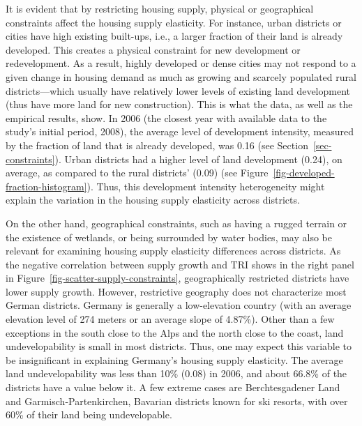 \documentclass[
  12pt,
]{article}
\begin{document}
It is evident that by restricting housing supply, physical or
geographical constraints affect the housing supply elasticity. For
instance, urban districts or cities have high existing built-ups, i.e.,
a larger fraction of their land is already developed. This creates a
physical constraint for new development or redevelopment. As a result,
highly developed or dense cities may not respond to a given change in
housing demand as much as growing and scarcely populated rural
districts---which usually have relatively lower levels of existing land
development (thus have more land for new construction). This is what the
data, as well as the empirical results, show. In 2006 (the closest year
with available data to the study's initial period, 2008), the average
level of development intensity, measured by the fraction of land that is
already developed, was 0.16 (see Section~\ref{sec-constraints}). Urban
districts had a higher level of land development (0.24), on average, as
compared to the rural districts' (0.09) (see
Figure~\ref{fig-developed-fraction-histogram}). Thus, this development
intensity heterogeneity might explain the variation in the housing
supply elasticity across districts.

On the other hand, geographical constraints, such as having a rugged
terrain or the existence of wetlands, or being surrounded by water
bodies, may also be relevant for examining housing supply elasticity
differences across districts. As the negative correlation between supply
growth and TRI shows in the right panel in
Figure~\ref{fig-scatter-supply-constraints}, geographically restricted
districts have lower supply growth. However, restrictive geography does
not characterize most German districts. Germany is generally a
low-elevation country (with an average elevation level of 274 meters or
an average slope of 4.87\%). Other than a few exceptions in the south
close to the Alps and the north close to the coast, land
undevelopability is small in most districts. Thus, one may expect this
variable to be insignificant in explaining Germany's housing supply
elasticity. The average land undevelopability was less than 10\% (0.08)
in 2006, and about 66.8\% of the districts have a value below it. A few
extreme cases are Berchtesgadener Land and Garmisch-Partenkirchen,
Bavarian districts known for ski resorts, with over 60\% of their land
being undevelopable.
\end{document}
